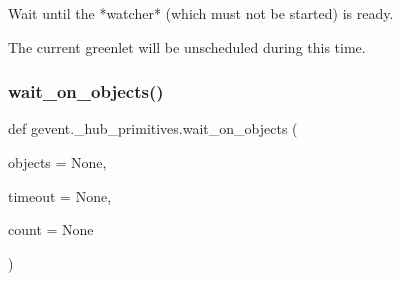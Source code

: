 \begin{DoxyVerb}Wait until the *watcher* (which must not be started) is ready.

The current greenlet will be unscheduled during this time.
\end{DoxyVerb}
 \mbox{\label{namespacegevent_1_1__hub__primitives_a670618f9da100eaaa5d2a7b80b746926}} 
\subsubsection{\texorpdfstring{wait\+\_\+on\+\_\+objects()}{wait\_on\_objects()}}
{\footnotesize\ttfamily def gevent.\+\_\+hub\+\_\+primitives.\+wait\+\_\+on\+\_\+objects (\begin{DoxyParamCaption}\item[{}]{objects = {\ttfamily None},  }\item[{}]{timeout = {\ttfamily None},  }\item[{}]{count = {\ttfamily None} }\end{DoxyParamCaption})}

